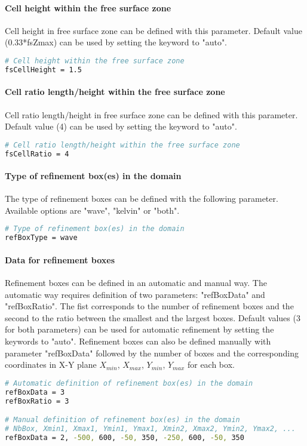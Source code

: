\paragraph{Cell height within the free surface zone}
Cell height in free surface zone can be defined with this parameter. Default value (0.33*fsZmax) can be used by setting the keyword to "auto".
\begin{lstlisting}[language=bash]
# Cell height within the free surface zone
fsCellHeight = 1.5
\end{lstlisting}

\paragraph{Cell ratio length/height within the free surface zone}
Cell ratio  length/height in free surface zone can be defined with this parameter. Default value (4) can be used by setting the keyword to "auto".
\begin{lstlisting}[language=bash]
# Cell ratio length/height within the free surface zone
fsCellRatio = 4
\end{lstlisting}

\paragraph{Type of refinement box(es) in the domain}
The type of refinement boxes can be defined with the following parameter. Available options are "wave", "kelvin" or "both".
\begin{lstlisting}[language=bash]
# Type of refinement box(es) in the domain
refBoxType = wave
\end{lstlisting}

\paragraph{Data for refinement boxes}
Refinement boxes can be defined in an automatic and manual way. The automatic way requires definition of two parameters: "refBoxData" and "refBoxRatio". The fist corresponds to the number of refinement boxes and the second to the ratio between the smallest and the largest boxes. Default values (3 for both parameters) can be used for automatic refinement by setting the keywords to "auto". Refinement boxes can also be defined manually with parameter "refBoxData" followed by the number of boxes and the corresponding coordinates in X-Y plane $X_{min}$, $X_{max}$, $Y_{min}$, $Y_{max}$ for each box.
\begin{lstlisting}[language=bash]
# Automatic definition of refinement box(es) in the domain
refBoxData = 3
refBoxRatio = 3

# Manual definition of refinement box(es) in the domain
# NbBox, Xmin1, Xmax1, Ymin1, Ymax1, Xmin2, Xmax2, Ymin2, Ymax2, ... 
refBoxData = 2, -500, 600, -50, 350, -250, 600, -50, 350 
\end{lstlisting}


